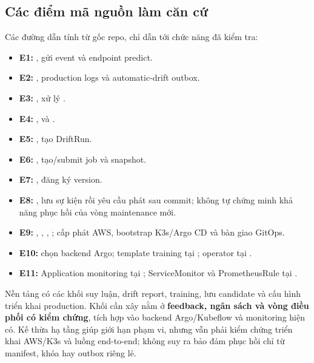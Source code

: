 \subsection{Các điểm mã nguồn làm căn cứ}
Các đường dẫn tính từ gốc repo, chỉ dẫn tới chức năng đã kiểm tra:
\begin{itemize}
  \item \textbf{E1:} , gửi event và endpoint predict.
  \item \textbf{E2:} , production logs và automatic-drift outbox.
  \item \textbf{E3:} , xử lý .
  \item \textbf{E4:} ,  và .
  \item \textbf{E5:} , tạo DriftRun.
  \item \textbf{E6:} , tạo/submit job và snapshot.
  \item \textbf{E7:} , đăng ký version.
  \item \textbf{E8:} , lưu sự kiện rồi yêu cầu phát sau commit; không tự chứng minh khả năng phục hồi của vòng maintenance mới.
  \item \textbf{E9:} , , , ; cấp phát AWS, bootstrap K3s/Argo CD và bàn giao GitOps.
  \item \textbf{E10:}  chọn backend Argo; template training tại ; operator tại .
  \item \textbf{E11:} Application monitoring tại ; ServiceMonitor và PrometheusRule tại .
\end{itemize}
Nền tảng có các khối suy luận, drift report, training, lưu candidate và cấu hình triển khai production. Khối cần xây nằm ở \textbf{feedback, ngân sách và vòng điều phối có kiểm chứng}, tích hợp vào backend Argo/Kubeflow và monitoring hiện có. Kế thừa hạ tầng giúp giới hạn phạm vi, nhưng vẫn phải kiểm chứng triển khai AWS/K3s và luồng end-to-end; không suy ra bảo đảm phục hồi chỉ từ manifest, khóa hay outbox riêng lẻ.
